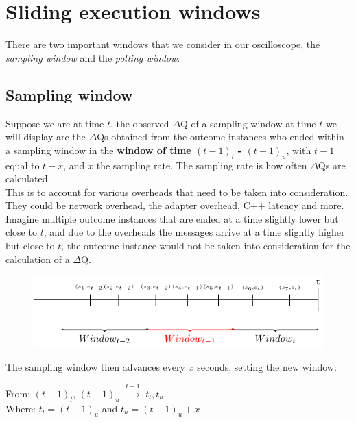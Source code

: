 \section{Sliding execution windows}

    There are two important windows that we consider in our oscilloscope, the \textit{sampling window} and the \textit{polling window}.

    \subsection{Sampling window}
    Suppose we are at time $t$, the observed $\Delta$Q of a sampling window at time $t$ we will display are the $\Delta$Qs obtained from the outcome instances who ended within a sampling window in the \textbf{window of time $(t-1)_{l}$ - $(t-1)_u$}, with $t-1$ equal to $t - x$, and $x$ the sampling rate. The sampling rate is how often $\Delta$Qs are calculated. \\
    This is to account for various overheads that need to be taken into consideration. They could be network overhead, the adapter overhead, C++ latency and more. Imagine multiple outcome instances that are ended at a time slightly lower but close to $t$, and due to the overheads the messages arrive at a time slightly higher but close to $t$, the outcome instance would not be taken into consideration for the calculation of a $\Delta$Q.
    
    \begin{figure}[H]
        \begin{center}
            \includegraphics[scale = 0.8]{tikz/window.pdf}
        \end{center}
    \end{figure}
    
    The sampling window then advances every $x$ seconds, setting the new window: 
    \begin{center}
        From: $(t-1)_l$, $(t-1)_u$ $\xrightarrow{t + 1}$ $t_l, t_u$. \\
        Where: $t_l = (t-1)_u$ and $t_u = (t-1)_u + x$ 
    \end{center}
    
